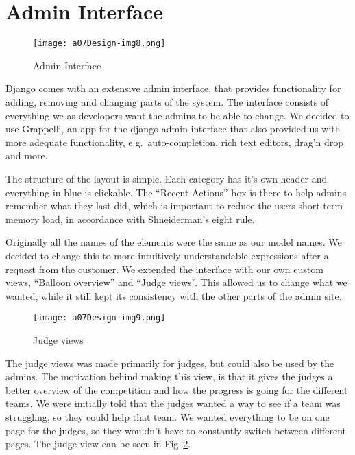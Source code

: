 \section{Admin Interface}

 \begin{figure}[h!]
	\texttt{[image: a07Design-img8.png]} 
	\caption{Admin Interface}
	\label{fig:adminInterface}
\end{figure}

Django comes with an
extensive admin interface, that provides functionality for adding,
removing and changing parts of the system. The interface consists
of everything we as developers want the admins to be able to change.
We decided to use
Grappelli, an app for the django admin interface that also provided us
with more adequate functionality, e.g.\ auto-completion, rich text
editors, drag'n drop and more.

The structure of the layout is simple. Each category has
it's own header and everything in blue is clickable.
The ``Recent Actions'' box is there
to help admins remember what they last did, which is important to
reduce the users short-term memory load, in accordance with
Shneiderman's eight rule.

Originally all the names of the elements were the same as our model
names. We decided to change this to more intuitively understandable
expressions after a request from the customer.
We extended the interface with our own custom views, ``Balloon overview'' and ``Judge views''. 
This allowed us to change 
what we wanted, while it still kept its consistency with the other parts 
of the admin site.



 \begin{figure}[h!]
	\texttt{[image: a07Design-img9.png]} 
	\caption{Judge views}
	\label{fig:judge}
\end{figure}

The judge views was made primarily for judges, but could also be used
by the admins. The motivation behind making this view, is that it gives
the judges a better overview of the competition and how the progress
is going for the different teams. We were initially told that the
judges wanted a way to see if a team was struggling, so they could help
that team. We wanted everything to be on one page for the judges, so they
wouldn't have to constantly switch between different
pages. The judge view can be seen in Fig~\ref{fig:judge}.  

